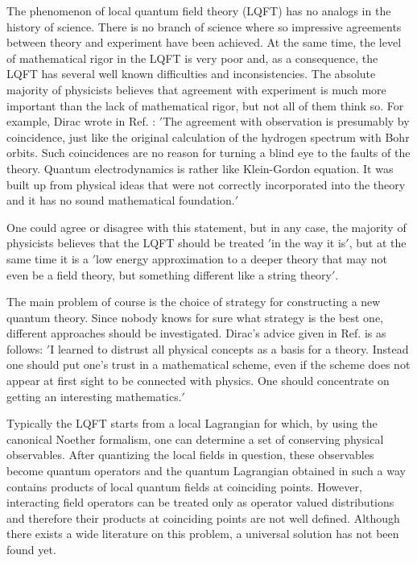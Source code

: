 \documentclass[a4paper,12pt]{article}%
\begin{document}
The phenomenon of local quantum field theory (LQFT) has no 
analogs in the history of science. There is no branch of 
science where so impressive agreements between theory and 
experiment have been
achieved. At the same time, the level of mathematical rigor 
in the LQFT is very poor and, as a consequence,
the LQFT has several well known difficulties and 
inconsistencies. The absolute majority of physicists believes
that agreement with experiment is much more important than the
lack of mathematical rigor, but not all of them think so.
For example, Dirac wrote in Ref. \cite{DirMath}: 
$'$The agreement
with observation is presumably by coincidence, just like the
original calculation of the hydrogen spectrum with Bohr orbits.
Such coincidences are no reason for turning a blind eye to the
faults of the theory. Quantum electrodynamics is rather like
Klein-Gordon equation. It was built up from physical ideas
that were not correctly incorporated into the theory and it
has no sound mathematical foundation.$'$  

One could agree or disagree with this statement, but in any
case, the majority of physicists believes that the LQFT should
be treated \cite{Wein} $'$in the way it is$'$, but at the same
time it is \cite{Wein} a $'$low energy approximation to a
deeper theory that may not even be a field theory, but something
different like a string theory$'$. 

The main problem of course is the choice of strategy
for constructing a new quantum theory. Since 
nobody knows for sure what strategy is the best one, 
different approaches should be investigated. Dirac's 
advice given in Ref. \cite{DirMath} is as follows: 
$'$I learned to distrust all
physical concepts as a basis for a theory. Instead one should
put one's trust in a mathematical scheme, even if the scheme
does not appear at first sight to be connected with physics.
One should concentrate on getting an interesting mathematics.$'$ 

Typically the LQFT starts from a local Lagrangian for which, by
using the canonical Noether formalism, one can determine a set of
conserving physical observables. After quantizing the local fields
in question, these observables become quantum operators 
and the quantum Lagrangian obtained in such a way contains
products of local quantum fields at coinciding points. 
However, interacting field operators can be treated only
as operator valued distributions \cite{Haag} and therefore their
products at coinciding points are not well defined.
Although there exists a wide literature on this problem, 
a universal solution has not been found yet.
\end{document}
